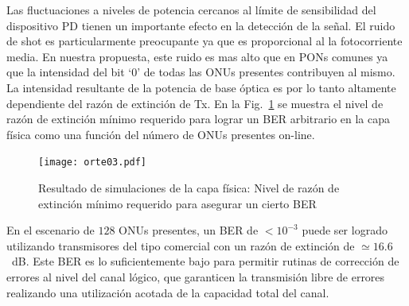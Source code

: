 Las fluctuaciones a niveles de potencia cercanos al límite de sensibilidad del dispositivo PD tienen un importante efecto en la detección de la señal.
El ruido de shot es particularmente preocupante ya que es proporcional al la fotocorriente media. En nuestra propuesta, este ruido es mas alto que en PONs comunes ya que la intensidad del bit `0' de todas las ONUs presentes contribuyen al mismo.
La intensidad resultante de la potencia de base óptica es por lo tanto altamente dependiente del razón de extinción de Tx.
En la Fig.~\ref{sim:optical} se muestra el nivel de razón de extinción mínimo requerido para lograr un BER arbitrario en la capa física como una función del número de ONUs presentes on-line.
\begin{figure}[!t]
    \centering
      \texttt{[image: orte03.pdf]}
      \caption{Resultado de simulaciones de la capa física: Nivel de razón de extinción mínimo requerido para asegurar un cierto BER}
      \label{sim:optical}
\end{figure}
En el escenario de $128$ ONUs presentes, un BER de $<10^{-3}$ puede ser logrado utilizando transmisores del tipo comercial con un razón de extinción de $\simeq16.6$~dB.
Este BER es lo suficientemente bajo para permitir rutinas de corrección de errores al nivel del canal lógico, que garanticen la transmisión libre de errores realizando una utilización acotada de la capacidad total del canal.
